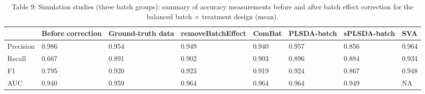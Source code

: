 \documentclass[
]{book}
\begin{document}
\begin{table}

\caption{\label{tab:unnamed-chunk-128}Table 9: Simulation studies (three batch groups): summary of accuracy measurements before and after batch effect correction for the balanced batch × treatment design (mean).}
\centering
\begin{tabular}[t]{l|l|l|l|l|l|l|l}
\hline
  & Before correction & Ground-truth data & removeBatchEffect & ComBat & PLSDA-batch & sPLSDA-batch & SVA\\
\hline
Precision & 0.986 & 0.954 & 0.949 & 0.940 & 0.957 & 0.856 & 0.964\\
\hline
Recall & 0.667 & 0.891 & 0.902 & 0.903 & 0.896 & 0.884 & 0.934\\
\hline
F1 & 0.795 & 0.920 & 0.923 & 0.919 & 0.924 & 0.867 & 0.948\\
\hline
AUC & 0.940 & 0.959 & 0.964 & 0.964 & 0.964 & 0.949 & NA\\
\hline
\end{tabular}
\end{table}
\end{document}
